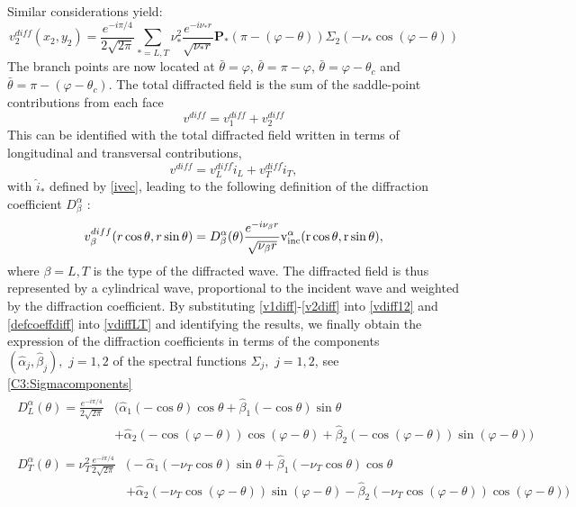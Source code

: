 Similar considerations yield:
\begin{equation}
v_2^{diff}(x_2,y_2)=\frac{e^{-i\pi/4}}{2\sqrt{2\pi}}\sum_{*=L,T}\nu_*^2\frac{e^{-i\nu_*r}}{\sqrt{\nu_*r}}\mathbf{P_*}(\pi-(\varphi-\theta))\Sigma_2(-\nu_*\cos(\varphi-\theta))
\label{v2diff}
\end{equation}
The branch points are now located at $\bar{\theta}=\varphi$, $\bar{\theta}=\pi-\varphi$, $\bar{\theta}=\varphi-\theta_c$ and $\bar{\theta}=\pi-(\varphi-\theta_c)$.
The total diffracted field is the sum of the saddle-point contributions from each face
\begin{equation}
v^{diff}=v_1^{diff}+v_2^{diff}
\label{vdiff12}
\end{equation}
This can be identified with the total diffracted field written in terms of longitudinal and transversal contributions, 
\begin{equation}
v^{diff}=v^{diff}_L \hat{i}_L+v^{diff}_T \hat{i}_T,
\label{vdiffLT}
\end{equation}
with $\hat{i}_*$ defined by \eqref{ivec}, leading to the following definition of the diffraction coefficient $D_{\beta}^{\alpha}$ : 
\begin{equation}
v_{\beta}^{diff}(r\cos\theta,r\sin\theta)=D_{\beta}^{\alpha}(\theta)\frac{e^{-i\nu_{\beta}r}}{\sqrt{\nu_{\beta}r}} \rm v^{\alpha}_{inc}(r\cos\theta,r\sin\theta),
\label{defcoeffdiff}
\end{equation}
where $\beta=L,T$ is the type of the diffracted wave. The diffracted field is thus represented by a cylindrical wave, proportional to the incident wave and weighted by the diffraction coefficient. By substituting \eqref{v1diff}-\eqref{v2diff} into \eqref{vdiff12} and \eqref{defcoeffdiff} into \eqref{vdiffLT} and identifying the results, we finally obtain the expression of the diffraction coefficients in terms of the components $(\hat{\alpha}_j,\hat{\beta}_j), \, \, j=1,2$ of the spectral functions $\Sigma_j, \, \, j=1,2$, see \eqref{C3:Sigmacomponents}
\begin{gather}
\begin{split}
 D^{\alpha}_L(\theta)=\frac{e^{-i\pi/4}}{2\sqrt{2\pi}}&\big(\hat{\alpha}_1(-\cos\theta)\cos\theta+\hat{\beta}_1(-\cos\theta)\sin\theta\\
&+\hat{\alpha}_2(-\cos(\varphi-\theta))\cos(\varphi-\theta)+\hat{\beta}_2(-\cos(\varphi-\theta))\sin(\varphi-\theta)\big)
\end{split} \label{DL}\\
\begin{split}
 D^{\alpha}_T(\theta)=\nu_T^2\frac{e^{-i\pi/4}}{2\sqrt{2\pi}}&\big(-\hat{\alpha}_1(-\nu_T\cos\theta)\sin\theta+\hat{\beta}_1(-\nu_T\cos\theta)\cos\theta\\
&+\hat{\alpha}_2(-\nu_T\cos(\varphi-\theta))\sin(\varphi-\theta)-\hat{\beta}_2(-\nu_T\cos(\varphi-\theta))\cos(\varphi-\theta)\big) 
\end{split} \label{DT}
\end{gather}

